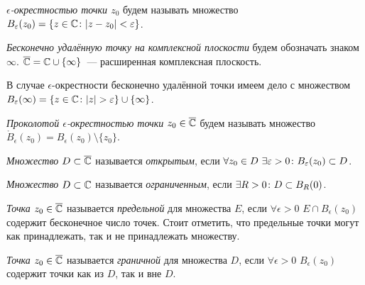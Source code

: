 
\begin{definition}
\textit{\(\epsilon\)-окрестностью точки \(z_0\)} будем называть множество \(B_\epsilon(z_0) \hm= \{z
\in \Co \colon |z - z_0| < \epsilon\}\).
\end{definition}

\begin{definition}
\textit{Бесконечно удалённую точку на комплексной плоскости} будем обозначать знаком \(\infty\).
\(\overline{\mathbb{C}} = \mathbb{C} \cup \{\infty\}\)~--- расширенная комплексная плоскость.
\end{definition}

В случае \(\epsilon\)-окрестности бесконечно удалённой точки имеем дело с множеством \(B_\epsilon
(\infty) \hm= \{z \in \Co \colon |z| > \epsilon\} \cup \{\infty\}\).

\begin{definition}
\textit{Проколотой \(\epsilon\)-окрестностью точки \(z_0 \in \overline{\mathbb{C}}\)} будем называть
множество \(\mathring{B}_\epsilon(z_0) = B_\epsilon(z_0) \setminus \{z_0\}\).
\end{definition}

\begin{definition}
\textit{Множество \(D \subset \overline{\mathbb{C}}\)} называется \textit{открытым}, если \(\forall z_0 \in D \
\exists \epsilon \hm> 0 \colon B_\epsilon(z_0) \subset D\).
\end{definition}

\begin{definition}
\textit{Множество \(D \subset \mathbb{C}\)} называется \textit{ограниченным}, если \(\exists R > 0 \colon
D \hm\subset B_R(0)\).
\end{definition}

\begin{definition}
\textit{Точка \(z_0 \in \overline{\mathbb{C}}\)} называется \textit{предельной} для множества \(E\), если \(\forall
\epsilon > 0\) \(E \cap B_\epsilon(z_0)\) содержит бесконечное число точек. Стоит
отметить, что предельные точки могут как принадлежать, так и не принадлежать множеству.
\end{definition}

\begin{definition}
\textit{Точка \(z_0 \in \overline{\mathbb{C}}\)} называется \textit{граничной} для множества \(D\), если \(\forall
\epsilon > 0\) \(B_\epsilon(z_0)\) содержит точки как из \(D\), так и вне \(D\).
\end{definition}

